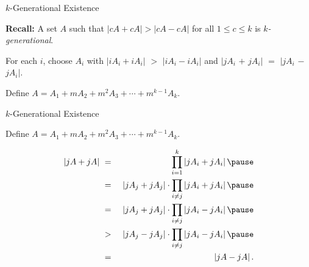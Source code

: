\documentclass[11pt]{beamer}
\newcommand{\Bigskip}{\bigskip
\medskip}
\begin{document}

\begin{frame}{$k$-Generational Existence}

\textbf{Recall: } A set $A$ such that $|cA+cA|>|cA-cA|$ for all $1\leq c \leq k$ is \emph{$k$-generational}.




\pause
\Bigskip

For each $i$, choose $A_{i}$ with $\left|iA_{i}+iA_{i}\right|$ $>$ $\left|iA_{i}-iA_{i}\right|$
and $|jA_{i}$ $+$ $jA_{i}|$ $=$ $|jA_{i}$ $-$ $jA_{i}|$.

\pause
\Bigskip

Define $A=A_{1}+mA_{2}+m^{2}A_{3}+\cdots+m^{k-1}A_{k}$.

\end{frame}


\begin{frame}{$k$-Generational Existence}

Define $A=A_{1}+mA_{2}+m^{2}A_{3}+\cdots+m^{k-1}A_{k}$.

\vspace{-\baselineskip}

\begin{eqnarray*}
	\left| jA+jA\right| \ &=& \ \prod_{i=1}^{k}\left|jA_{i}+jA_{i} \right| \pause \\
	 \ &=& \ \left|jA_{j}+jA_{j}\right|\cdot\prod_{i\neq j}\left|jA_{i}+jA_{i}\right|\pause \\
	 \ &=& \ \left|jA_{j}+jA_{j}\right|\cdot\prod_{i\neq j}\left|jA_{i}-jA_{i}\right|\pause \\ 
	 \ &>& \ \left|jA_{j}-jA_{j}\right|\cdot\prod_{i\neq j}\left|jA_{i}-jA_{i}\right|\pause \\
	 \ &=& \ \left|jA-jA\right|.
\end{eqnarray*}
    
\end{frame}
\end{document}
